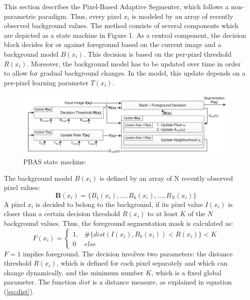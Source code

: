 This section describes the Pixel-Based Adaptive Segmenter, which follows a non-parametric paradigm. Thus, every pixel $x_i$ is modeled by an array of recently observed background values. The method consists of several components which are depicted as a state machine in Figure 1. As a central component, the decision block decides for or against foreground based on the current image and a background model $B(x_i)$. This decision is based on the per-pixel threshold $R(x_i)$. Moreover, the background model has to be updated over time in order to allow for gradual background changes. In the model, this update depends on a per-pixel learning parameter $T(x_i)$.
\newline
\begin{figure}
    \includegraphics[width=\textwidth]{Figures/PBAS_state_machine.png}
    \caption{PBAS state machine.}
\end{figure}

The background model $B(x_i)$ is defined by an array of N recently observed pixel values:
\begin{equation}
\mathbf{B}(x_i) = \{B_1(x_i),...,B_k(x_i),...,B_N(x_i)\}
\end{equation}
A pixel $x_i$ is decided to belong to the background, if its
pixel value $I(x_i) $ is closer than a certain decision threshold
$R(x_i)$ to at least $K$ of the $N$ background values. Thus,
the foreground segmentation mask is calculated as:
\begin{equation} \label{eq:F}
F(x_i) = \begin{cases} 1,& \#\{dist(I(x_i), B_k(x_i)) < R(x_i)\} < K \\0 &else\end{cases}
\end{equation}
$F = 1$ implies foreground. The decision involves two parameters: the distance threshold $R(x_i)$, which is defined for each pixel separately and which can change dynamically, and the minimum number $K$, which is a fixed global parameter. The function $dist$ is a distance measure, as explained in equation (\ref{eq:dist}).
